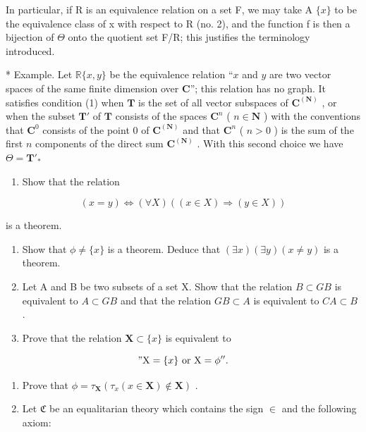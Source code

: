 In particular, if R is an equivalence relation on a set F, we may take A \(\{x\}\) to be the equivalence class of x with respect to R (no. 2), and the function f is then a bijection of \(\Theta\) onto the quotient set F/R; this justifies the terminology introduced.

* Example. Let \(\mathbb{R}\{x, y\}\) be the equivalence relation ``\(x\) and \(y\) are two vector spaces of the same finite dimension over \(\mathbf{C}\)''; this relation has no graph. It satisfies condition (1) when \(\mathbf{T}\) is the set of all vector subspaces of \(\mathbf{C}^{(\mathbf{N})}\) , or when the subset \(\mathbf{T}'\) of \(\mathbf{T}\) consists of the spaces \(\mathbf{C}^n\) ( \(n \in \mathbf{N}\) ) with the conventions that \(\mathbf{C}^0\) consists of the point 0 of \(\mathbf{C}^{(\mathbf{N})}\) and that \(\mathbf{C}^n\) ( \(n > 0\) ) is the sum of the first \(n\) components of the direct sum \(\mathbf{C}^{(\mathbf{N})}\) . With this second choice we have \(\Theta = \mathbf{T}'_*\)

\startexercises

\exercisegroup

\begin{enumerate}
\def\labelenumi{\arabic{enumi}.}
\tightlist
\item
  Show that the relation
\end{enumerate}

\[
(x = y) \iff (\forall X) ((x \in X) \Longrightarrow (y \in X))
\]

is a theorem.

\begin{enumerate}
\def\labelenumi{\arabic{enumi}.}
\setcounter{enumi}{1}
\item
  Show that \(\phi \neq \{x\}\) is a theorem. Deduce that \((\exists x)(\exists y)(x \neq y)\) is a theorem.
\item
  Let A and B be two subsets of a set X. Show that the relation \(B \subset GB\) is equivalent to \(A \subset GB\) and that the relation \(GB \subset A\) is equivalent to \(CA \subset B\) .
\item
  Prove that the relation \(\mathbf{X} \subset \{x\}\) is equivalent to
\end{enumerate}

\[
" \mathrm{X} = \{x \} \text { or } \mathrm{X} = \phi^ {\prime \prime}.
\]

\begin{enumerate}
\def\labelenumi{\arabic{enumi}.}
\setcounter{enumi}{4}
\item
  Prove that \(\phi = \tau_{\mathbf{X}}(\tau_x(x \in \mathbf{X}) \notin \mathbf{X})\) .
\item
  Let \(\mathfrak{C}\) be an equalitarian theory which contains the sign \(\in\) and the following axiom:
\end{enumerate}

